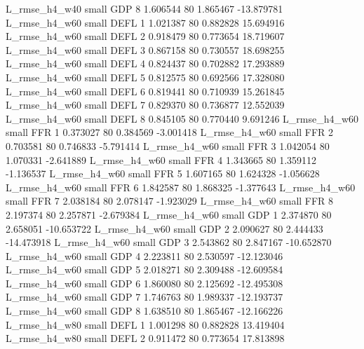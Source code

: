  L_rmse_h4_w40      small      GDP                 8 1.606544 80       1.865467         -13.879781
 L_rmse_h4_w60      small     DEFL                 1 1.021387 80       0.882828          15.694916
 L_rmse_h4_w60      small     DEFL                 2 0.918479 80       0.773654          18.719607
 L_rmse_h4_w60      small     DEFL                 3 0.867158 80       0.730557          18.698255
 L_rmse_h4_w60      small     DEFL                 4 0.824437 80       0.702882          17.293889
 L_rmse_h4_w60      small     DEFL                 5 0.812575 80       0.692566          17.328080
 L_rmse_h4_w60      small     DEFL                 6 0.819441 80       0.710939          15.261845
 L_rmse_h4_w60      small     DEFL                 7 0.829370 80       0.736877          12.552039
 L_rmse_h4_w60      small     DEFL                 8 0.845105 80       0.770440           9.691246
 L_rmse_h4_w60      small      FFR                 1 0.373027 80       0.384569          -3.001418
 L_rmse_h4_w60      small      FFR                 2 0.703581 80       0.746833          -5.791414
 L_rmse_h4_w60      small      FFR                 3 1.042054 80       1.070331          -2.641889
 L_rmse_h4_w60      small      FFR                 4 1.343665 80       1.359112          -1.136537
 L_rmse_h4_w60      small      FFR                 5 1.607165 80       1.624328          -1.056628
 L_rmse_h4_w60      small      FFR                 6 1.842587 80       1.868325          -1.377643
 L_rmse_h4_w60      small      FFR                 7 2.038184 80       2.078147          -1.923029
 L_rmse_h4_w60      small      FFR                 8 2.197374 80       2.257871          -2.679384
 L_rmse_h4_w60      small      GDP                 1 2.374870 80       2.658051         -10.653722
 L_rmse_h4_w60      small      GDP                 2 2.090627 80       2.444433         -14.473918
 L_rmse_h4_w60      small      GDP                 3 2.543862 80       2.847167         -10.652870
 L_rmse_h4_w60      small      GDP                 4 2.223811 80       2.530597         -12.123046
 L_rmse_h4_w60      small      GDP                 5 2.018271 80       2.309488         -12.609584
 L_rmse_h4_w60      small      GDP                 6 1.860080 80       2.125692         -12.495308
 L_rmse_h4_w60      small      GDP                 7 1.746763 80       1.989337         -12.193737
 L_rmse_h4_w60      small      GDP                 8 1.638510 80       1.865467         -12.166226
 L_rmse_h4_w80      small     DEFL                 1 1.001298 80       0.882828          13.419404
 L_rmse_h4_w80      small     DEFL                 2 0.911472 80       0.773654          17.813898
